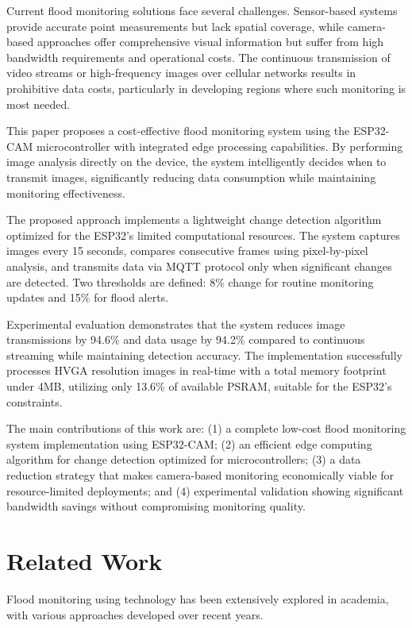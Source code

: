 \documentclass[conference]{IEEEtran}
\begin{document}
Current flood monitoring solutions face several challenges. Sensor-based systems provide accurate point measurements but lack spatial coverage, while camera-based approaches offer comprehensive visual information but suffer from high bandwidth requirements and operational costs. The continuous transmission of video streams or high-frequency images over cellular networks results in prohibitive data costs, particularly in developing regions where such monitoring is most needed.

This paper proposes a cost-effective flood monitoring system using the ESP32-CAM microcontroller with integrated edge processing capabilities. By performing image analysis directly on the device, the system intelligently decides when to transmit images, significantly reducing data consumption while maintaining monitoring effectiveness.

The proposed approach implements a lightweight change detection algorithm optimized for the ESP32's limited computational resources. The system captures images every 15 seconds, compares consecutive frames using pixel-by-pixel analysis, and transmits data via MQTT protocol only when significant changes are detected. Two thresholds are defined: 8\% change for routine monitoring updates and 15\% for flood alerts.

Experimental evaluation demonstrates that the system reduces image transmissions by 94.6\% and data usage by 94.2\% compared to continuous streaming while maintaining detection accuracy. The implementation successfully processes HVGA resolution images in real-time with a total memory footprint under 4MB, utilizing only 13.6\% of available PSRAM, suitable for the ESP32's constraints.

The main contributions of this work are: (1) a complete low-cost flood monitoring system implementation using ESP32-CAM; (2) an efficient edge computing algorithm for change detection optimized for microcontrollers; (3) a data reduction strategy that makes camera-based monitoring economically viable for resource-limited deployments; and (4) experimental validation showing significant bandwidth savings without compromising monitoring quality.

\section{Related Work}

Flood monitoring using technology has been extensively explored in academia, with various approaches developed over recent years.
\end{document}
